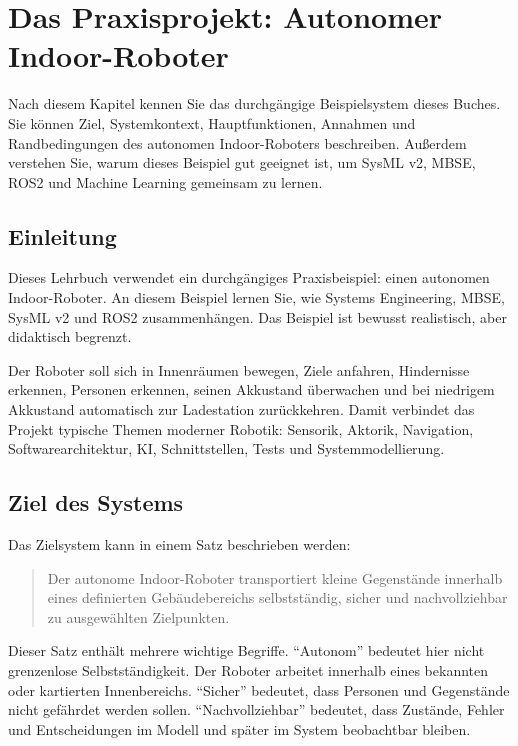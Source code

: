 \chapter{Das Praxisprojekt: Autonomer Indoor-Roboter}

\begin{lernziele}
Nach diesem Kapitel kennen Sie das durchgängige Beispielsystem dieses Buches. Sie können Ziel, Systemkontext, Hauptfunktionen, Annahmen und Randbedingungen des autonomen Indoor-Roboters beschreiben. Außerdem verstehen Sie, warum dieses Beispiel gut geeignet ist, um SysML v2, MBSE, ROS2 und Machine Learning gemeinsam zu lernen.
\end{lernziele}

\section{Einleitung}
Dieses Lehrbuch verwendet ein durchgängiges Praxisbeispiel: einen autonomen Indoor-Roboter. An diesem Beispiel lernen Sie, wie Systems Engineering, MBSE, SysML v2 und ROS2 zusammenhängen. Das Beispiel ist bewusst realistisch, aber didaktisch begrenzt.

Der Roboter soll sich in Innenräumen bewegen, Ziele anfahren, Hindernisse erkennen, Personen erkennen, seinen Akkustand überwachen und bei niedrigem Akkustand automatisch zur Ladestation zurückkehren. Damit verbindet das Projekt typische Themen moderner Robotik: Sensorik, Aktorik, Navigation, Softwarearchitektur, KI, Schnittstellen, Tests und Systemmodellierung.

\section{Ziel des Systems}
Das Zielsystem kann in einem Satz beschrieben werden:

\begin{quote}
Der autonome Indoor-Roboter transportiert kleine Gegenstände innerhalb eines definierten Gebäudebereichs selbstständig, sicher und nachvollziehbar zu ausgewählten Zielpunkten.
\end{quote}

Dieser Satz enthält mehrere wichtige Begriffe. \enquote{Autonom} bedeutet hier nicht grenzenlose Selbstständigkeit. Der Roboter arbeitet innerhalb eines bekannten oder kartierten Innenbereichs. \enquote{Sicher} bedeutet, dass Personen und Gegenstände nicht gefährdet werden sollen. \enquote{Nachvollziehbar} bedeutet, dass Zustände, Fehler und Entscheidungen im Modell und später im System beobachtbar bleiben.


